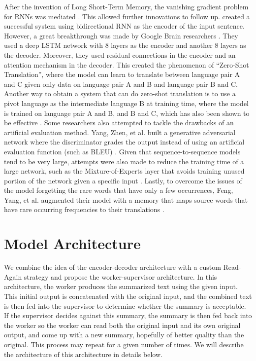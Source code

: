 \documentclass[letterpaper]{article} %
\begin{document}
After the invention of Long Short-Term Memory, the vanishing gradient problem for RNNs was mediated \cite{sutskever2014sequence}. This allowed further innovations to follow up. \cite{bahdanau2014neural} created a successful system using bidirectional RNN as the encoder of the input sentence. However, a great breakthrough was made by Google Brain researchers \cite{johnson2016google}. They used a deep LSTM network with 8 layers as the encoder and another 8 layers as the decoder. Moreover, they used residual connections in the encoder and an attention mechanism in the decoder. This created the phenomenon of “Zero-Shot Translation”, where the model can learn to translate between language pair A and C given only data on language pair A and B and language pair B and C. Another way to obtain a system that can do zero-shot translation is to use a pivot language as the intermediate language B at training time, where the model is trained on language pair A and B, and B and C, which has also been shown to be effective \cite{chen2017teacher}. Some researchers also attempted to tackle the drawbacks of an artificial evaluation method. Yang, Zhen, et al. built a generative adversarial network where the discriminator grades the output instead of using an artificial evaluation function (such as BLEU) \cite{yang2017improving}. Given that sequence-to-sequence models tend to be very large, attempts were also made to reduce the training time of a large network, such as the Mixture-of-Experts layer that avoids training unused portion of the network given a specific input \cite{shazeer2017outrageously}. Lastly, to overcome the issues of the model forgetting the rare words that have only a few occurrences, Feng, Yang, et al. augmented their model with a memory that maps source words that have rare occurring frequencies to their translations \cite{feng2017memory}.

\section{Model Architecture}
We combine the idea of the encoder-decoder architecture with a custom Read-Again strategy and propose the worker-supervisor architecture. In this architecture, the worker produces the summarized text using the given input. This initial output is concatenated with the original input, and the combined text is then fed into the supervisor to determine whether the summary is acceptable. If the supervisor decides against this summary, the summary is then fed back into the worker so the worker can read both the original input and its own original output, and come up with a new summary, hopefully of better quality than the original. This process may repeat for a given number of times. We will describe the architecture of this architecture in details below.
\end{document}
